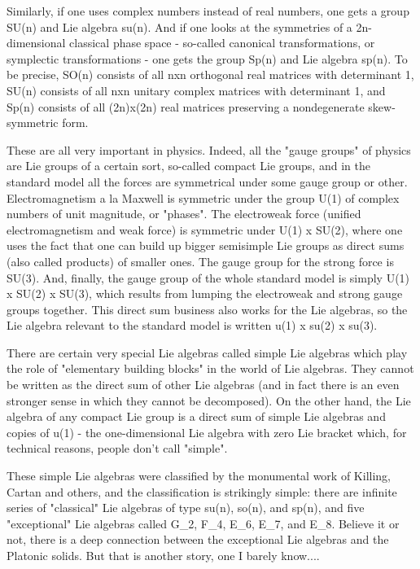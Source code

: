 Similarly, if one uses complex numbers instead of real numbers, 
one gets a group SU(n) and Lie algebra su(n).  And if one looks at the 
symmetries of a 2n-dimensional classical phase
space - so-called canonical transformations, or symplectic
transformations - one gets the group Sp(n) and Lie algebra sp(n).  
To be precise, SO(n) consists of all nxn orthogonal real matrices with
determinant 1, SU(n) consists of all nxn unitary complex matrices with
determinant 1, and Sp(n) consists of all (2n)x(2n) real matrices
preserving a nondegenerate skew-symmetric form.

These are all very important in physics.  Indeed, all the "gauge groups"
of physics are Lie groups of a certain sort, so-called compact
Lie groups, and in the standard model all the forces are
symmetrical under some gauge group or other.  Electromagnetism a la
Maxwell is symmetric under the group U(1) of complex numbers of unit
magnitude, or "phases".  The electroweak force (unified electromagnetism
and weak force) is symmetric under U(1) x SU(2), where one uses the fact
that one can build up bigger semisimple Lie groups as direct sums
(also called products) of smaller ones.  The gauge group for the
strong force is SU(3).  And, finally, the gauge group of the whole
standard model is simply U(1) x SU(2) x SU(3), which results from
lumping the electroweak and strong gauge groups together.  This direct
sum business also works for the Lie algebras, so the Lie algebra
relevant to the standard model is written u(1) x su(2) x su(3).

There are certain very special Lie algebras called simple Lie algebras
which play the role of "elementary building blocks" in the world of Lie
algebras.  They cannot be written as the direct sum of other Lie
algebras (and in fact there is an even stronger sense in which they
cannot be decomposed).  On the other hand, the Lie algebra of any
compact Lie group is a direct sum of simple Lie algebras and copies of
u(1) - the one-dimensional Lie algebra with zero Lie bracket which, for
technical reasons, people don't call "simple".  

These simple Lie algebras were classified by the monumental work of
Killing, Cartan and others, and the classification is strikingly simple:
there are infinite series of "classical" Lie algebras of type
su(n), so(n), and sp(n), and five "exceptional" Lie algebras
called G_2, F_4, E_6, E_7, and E_8.  Believe it or not, there is a deep
connection between the exceptional Lie algebras and the Platonic solids.
But that is another story, one I barely know....

